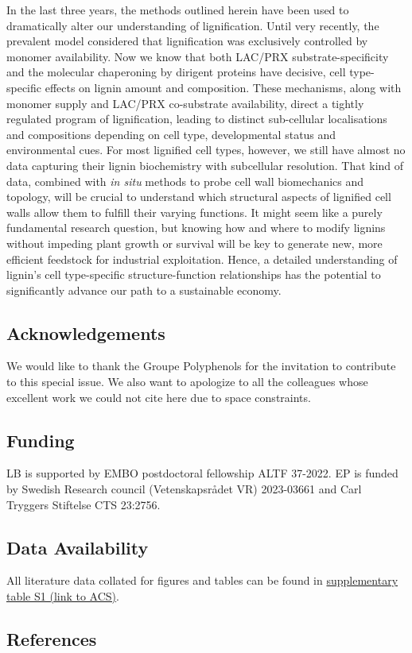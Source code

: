 \documentclass[journal=,manuscript=]{achemso}
\begin{document}
In the last three years, the methods outlined herein have been used to
dramatically alter our understanding of lignification. Until very
recently, the prevalent model considered that lignification was
exclusively controlled by monomer availability. Now we know that both
LAC/PRX substrate-specificity\citep{Blaschek2023, Hiraide2021, Zhuo2022}
and the molecular chaperoning by dirigent proteins\citep{Gao2023} have
decisive, cell type-specific effects on lignin amount and composition.
These mechanisms, along with monomer supply and LAC/PRX co-substrate
availability, direct a tightly regulated program of lignification,
leading to distinct sub-cellular localisations and compositions
depending on cell type, developmental status and environmental cues. For
most lignified cell types, however, we still have almost no data
capturing their lignin biochemistry with subcellular resolution. That
kind of data, combined with \emph{in situ} methods to probe cell wall
biomechanics and topology, will be crucial to understand which
structural aspects of lignified cell walls allow them to fulfill their
varying functions. It might seem like a purely fundamental research
question, but knowing how and where to modify lignins without impeding
plant growth or survival will be key to generate new, more efficient
feedstock for industrial exploitation. Hence, a detailed understanding
of lignin's cell type-specific structure-function relationships has the
potential to significantly advance our path to a sustainable economy.

\subsection{Acknowledgements}\label{acknowledgements}

We would like to thank the Groupe Polyphenols for the invitation to
contribute to this special issue. We also want to apologize to all the
colleagues whose excellent work we could not cite here due to space
constraints.

\subsection{Funding}\label{funding}

LB is supported by EMBO postdoctoral fellowship ALTF 37-2022. EP is
funded by Swedish Research council (Vetenskapsrådet VR) 2023-03661 and
Carl Tryggers Stiftelse CTS 23:2756.

\subsection{Data Availability}\label{data-availability}

All literature data collated for figures and tables can be found in
\href{https://pubs.acs.org/doi/suppl/10.1021/acs.jafc.4c01999/suppl_file/jf4c01999_si_001.xlsx}{supplementary
table S1 (link to ACS)}.

\subsection*{References}\label{references}

\renewcommand{\bibsection}{}

\end{document}
